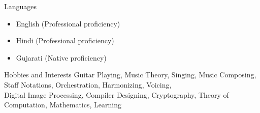 \documentclass{resume}
\begin{document}
\begin{rSection}{Languages}
\begin{itemize}
    \item English (Professional proficiency)
    \item Hindi (Professional proficiency)
    \item Gujarati (Native proficiency)
\end{itemize}
\end{rSection}

\begin{rSection}{Hobbies and Interests}
Guitar Playing, Music Theory, Singing, Music Composing, Staff Notations, Orchestration, Harmonizing, Voicing,
\\ Digital Image Processing, Compiler Designing, Cryptography, Theory of Computation, Mathematics, Learning
\end{rSection}
\end{document}
